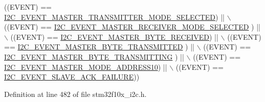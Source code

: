 \begin{DoxyCode}
                             ((EVENT) == 
      \hyperlink{group___i2_c___events_ga2361a6e60b7dc86fb682dd06fbd3edb7}{I2C\_EVENT\_MASTER\_TRANSMITTER\_MODE\_SELECTED}) || \(\backslash\)
                             ((EVENT) == \hyperlink{group___i2_c___events_gabfde82864432ddb87b6462234d542e60}{I2C\_EVENT\_MASTER\_RECEIVER\_MODE\_SELECTED}
      ) || \(\backslash\)
                             ((EVENT) == \hyperlink{group___i2_c___events_ga6bcf2ae49961e07e27cf9fdf334719e3}{I2C\_EVENT\_MASTER\_BYTE\_RECEIVED}) || \(\backslash\)
                             ((EVENT) == \hyperlink{group___i2_c___events_ga8fe3b96b54e3c38e1de5d48536039c8f}{I2C\_EVENT\_MASTER\_BYTE\_TRANSMITTED}
      ) || \(\backslash\)
                             ((EVENT) == \hyperlink{group___i2_c___events_ga037ac1e67e44ee085acac6f034bd73b2}{I2C\_EVENT\_MASTER\_BYTE\_TRANSMITTING}
      ) || \(\backslash\)
                             ((EVENT) == \hyperlink{group___i2_c___events_gad04882597bbf542c6fee7a9c837fbc8c}{I2C\_EVENT\_MASTER\_MODE\_ADDRESS10}) ||
       \(\backslash\)
                             ((EVENT) == \hyperlink{group___i2_c___events_ga249bd611f1ca64653c0bfc606c591088}{I2C\_EVENT\_SLAVE\_ACK\_FAILURE}))
\end{DoxyCode}


Definition at line 482 of file stm32f10x\+\_\+i2c.\+h.

